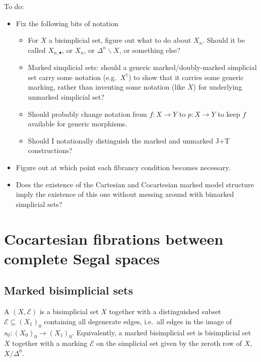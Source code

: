 \documentclass[main.tex]{subfiles}
\begin{document}
To do:
\begin{itemize}
  \item Fix the following bits of notation
    \begin{itemize}
      \item For $X$ a bisimplicial set, figure out what to do about $X_{n}$. Should it be called $X_{n, \bullet}$, or $X_{n}$, or $\Delta^{n} \backslash X$, or something else?

      \item Marked simplicial sets: should a generic marked/doubly-marked simplicial set carry some notation (e.g.\ $X^{\dagger}$) to show that it carries some generic marking, rather than inventing some notation (like $\mathring{X}$) for underlying unmarked simplicial set?

      \item Should probably change notation from $f\colon X \to Y$ to $p\colon X \to Y$ to keep $f$ available for generic morphisms.

      \item Should I notationally distinguish the marked and unmarked J+T constructions?
    \end{itemize}

  \item Figure out at which point each fibrancy condition becomes necessary.

  \item Does the existence of the Cartesian and Cocartesian marked model structure imply the existence of this one without messing around with bimarked simplicial sets?
\end{itemize}

\section{Cocartesian fibrations between complete Segal spaces}
\label{sec:cocartesian_fibrations_between_complete_segal_spaces}

\subsection{Marked bisimplicial sets}
\label{ssc:marked_bisimplicial_sets}

\begin{definition}
  A  $(X, \mathcal{E})$ is a bisimplicial set $X$ together with a distinguished subset $\mathcal{E} \subseteq (X_{1})_{0}$ containing all degenerate edges, i.e.\ all edges in the image of $s_{0}\colon (X_{0})_{0} \to (X_{1})_{0}$. Equivalently, a marked bisimplicial set is bisimplicial set $X$ together with a marking $\mathcal{E}$ on the simplicial set given by the zeroth row of $X$, $X / \Delta^{0}$.
\end{definition}
\end{document}
